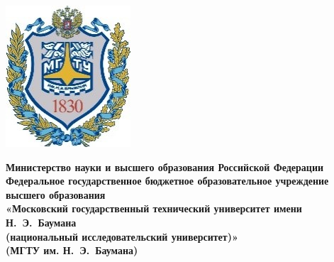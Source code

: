 \newcommand{\fixunderline}[3]
{
	$\underset{\text{#3}}{\text{\uline{\stackengine{0pt}{\hspace{#2}}{\text{#1}}{O}{c}{F}{F}{L}}}}$
}

\begin{titlepage}
	\fontsize{12pt}{12pt}\selectfont
	\noindent \begin{minipage}{0.15\textwidth}
		\includegraphics[width=\linewidth]{img/b_logo.jpg}
	\end{minipage}
	\noindent\begin{minipage}{0.9\textwidth}\centering
		\textbf{Министерство науки и высшего образования Российской Федерации}\\
		\textbf{Федеральное государственное бюджетное образовательное учреждение высшего образования}\\
		\textbf{«Московский государственный технический университет имени Н.~Э.~Баумана}\\
		\textbf{(национальный исследовательский университет)»}\\
		\textbf{(МГТУ им. Н.~Э.~Баумана)}
	\end{minipage}
	

\end{titlepage}
